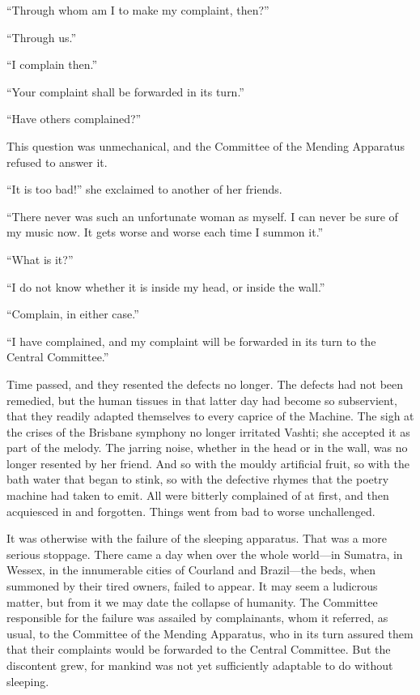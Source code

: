 ``Through whom am I to make my complaint, then?''

``Through us.''

``I complain then.''

``Your complaint shall be forwarded in its turn.''

``Have others complained?''

This question was unmechanical, and the Committee of the Mending Apparatus refused to answer it.

``It is too bad!'' she exclaimed to another of her friends.

``There never was such an unfortunate woman as myself. I can never be sure of my music now. It gets worse and worse each time I summon it.''

``What is it?''

``I do not know whether it is inside my head, or inside the wall.''

``Complain, in either case.''

``I have complained, and my complaint will be forwarded in its turn to the Central Committee.''

Time passed, and they resented the defects no longer. The defects had not been remedied, but the human tissues in that latter day had become so subservient, that they readily adapted themselves to every caprice of the Machine. The sigh at the crises of the Brisbane symphony no longer irritated Vashti; she accepted it as part of the melody. The jarring noise, whether in the head or in the wall, was no longer resented by her friend. And so with the mouldy artificial fruit, so with the bath water that began to stink, so with the defective rhymes that the poetry machine had taken to emit. All were bitterly complained of at first, and then acquiesced in and forgotten. Things went from bad to worse unchallenged. %

It was otherwise with the failure of the sleeping apparatus. That was a more serious stoppage. There came a day when over the whole world---in Sumatra, in Wessex, in the innumerable cities of Courland and Brazil---the beds, when summoned by their tired owners, failed to appear. It may seem a ludicrous matter, but from it we may date the collapse of humanity. The Committee responsible for the failure was assailed by complainants, whom it referred, as usual, to the Committee of the Mending Apparatus, who in its turn assured them that their complaints would be forwarded to the Central Committee. But the discontent grew, for mankind was not yet sufficiently adaptable to do without sleeping.

